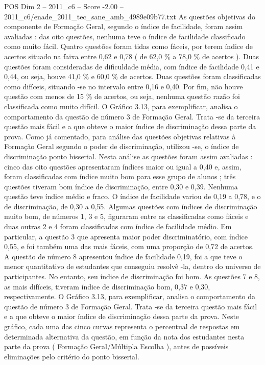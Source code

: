 \begin{textsample}{POS Dim 2 – 2011\_c6 – Score -2.00 – 2011\_c6/enade\_2011\_tec\_sane\_amb\_4989e09b77.txt}
As questões objetivas do componente de Formação Geral, segundo o índice de facilidade, foram assim avaliadas : das oito questões, nenhuma teve o índice de facilidade classificado como muito fácil.
Quatro questões foram tidas como fáceis, por terem índice de acertos situado na faixa entre 0,62 e 0,78 ( de 62,0 \% a 78,0 \% de acertos ).
Duas questões foram consideradas de dificuldade média, com índice de facilidade 0,41 e 0,44, ou seja, houve 41,0 \% e 60,0 \% de acertos.
Duas questões foram classificadas como difíceis, situando -se no intervalo entre 0,16 e 0,40.
Por fim, não houve questão com menos de 15 \% de acertos, ou seja, nenhuma questão razão foi classificada como muito difícil.
O Gráfico 3.13, para exemplificar, analisa o comportamento da questão de número 3 de Formação Geral.
Trata -se da terceira questão mais fácil e a que obteve o maior índice de discriminação dessa parte da prova.
Como já comentado, para análise das questões objetivas relativas à Formação Geral segundo o poder de discriminação, utilizou -se, o índice de discriminação ponto bisserial.
Nesta análise as questões foram assim avaliadas : cinco das oito questões apresentaram índices maior ou igual a 0,40 e, assim, foram classificadas com índice muito bom para esse grupo de alunos ; três questões tiveram bom índice de discriminação, entre 0,30 e 0,39.
Nenhuma questão teve índice médio e fraco.
O índice de facilidade variou de 0,19 a 0,78, e o de discriminação, de 0,30 a 0,55.
Algumas questões com índices de discriminação muito bom, de números 1, 3 e 5, figuraram entre as classificadas como fáceis e duas outras 2 e 4 foram classificadas com índice de facilidade médio.
Em particular, a questão 3 que apresenta maior poder discriminatório, com índice 0,55, e foi também uma das mais fáceis, com uma proporção de 0,72 de acertos.
A questão de número 8 apresentou índice de facilidade 0,19, foi a que teve o menor quantitativo de estudantes que conseguiu resolvê -la, dentro do universo de participantes.
No entanto, seu índice de discriminação foi bom.
As questões 7 e 8, as mais difíceis, tiveram índice de discriminação bom, 0,37 e 0,30, respectivamente.
O Gráfico 3.13, para exemplificar, analisa o comportamento da questão de número 3 de Formação Geral.
Trata -se da terceira questão mais fácil e a que obteve o maior índice de discriminação dessa parte da prova.
Neste gráfico, cada uma das cinco curvas representa o percentual de respostas em determinada alternativa da questão, em função da nota dos estudantes nesta parte da prova ( Formação Geral/Múltipla Escolha ), antes de possíveis eliminações pelo critério do ponto bisserial.

\end{textsample}

